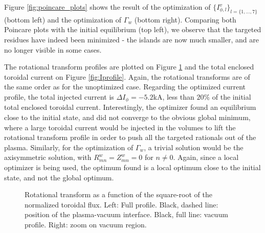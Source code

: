 Figure \ref{fig:poincare_plots} shows the result of the optimization of $\{I^v_{\phi,l}\}_{l=\{1,\ldots,7\}}$ (bottom left) and the optimization of $\Gamma_w$ (bottom right). Comparing both Poincare plots with the initial equilibrium (top left), we observe that the targeted residues have indeed been minimized - the islands are now much smaller, and are no longer visible in some cases.

The rotational transform profiles are plotted on Figure \ref{fig:iota_profile} and the total enclosed toroidal current on Figure \ref{fig:Iprofile}. Again, the rotational transforms are of the same order as for the unoptimized case. Regarding the optimized current profile, the total injected current is $\Delta I_\phi=-5.2$kA, less than $20\%$ of the initial total enclosed toroidal current. Interestingly, the optimizer found an equilibrium close to the initial state, and did not converge to the obvious global minimum, where a large toroidal current would be injected in the volumes to lift the rotational transform profile in order to push all the targeted rationals out of the plasma. Similarly, for the optimization of $\Gamma_w$, a trivial solution would be the axisymmetric solution, with $R^w_{mn}=Z^w_{mn}=0$ for $n\neq 0$. Again, since a local optimizer is being used, the optimum found is a local optimum close to the initial state, and not the global optimum.

\begin{figure}
    \centering
    \hfill
    \hfill
    \hfill
    \caption{Rotational transform as a function of the square-root of the normalized toroidal flux. Left: Full profile. Black, dashed line: position of the plasma-vacuum interface. Black, full line: vacuum profile. Right: zoom on vacuum region.}
    \label{fig:iota_profile}
\end{figure}

